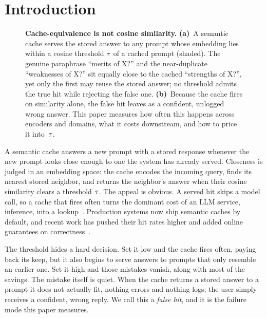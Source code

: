 \section{Introduction}
\label{sec:intro}

\begin{figure}[t]
  \centering
  
  \caption{\textbf{Cache-equivalence is not cosine similarity.} \textbf{(a)}~A semantic cache
    serves the stored answer to any prompt whose embedding lies within a cosine threshold
    $\tau$ of a cached prompt (shaded). The genuine paraphrase ``merits of X?'' and the
    near-duplicate ``weaknesses of X?'' sit equally close to the cached ``strengths of X?'',
    yet only the first may reuse the stored answer; no threshold admits the true hit while
    rejecting the false one. \textbf{(b)}~Because the cache fires on similarity alone, the
    false hit leaves as a confident, unlogged wrong answer. This paper measures how often this
    happens across encoders and domains, what it costs downstream, and how to price it
    into~$\tau$.}
  \label{fig:teaser}
\end{figure}

A semantic cache answers a new prompt with a stored response whenever the new prompt
looks close enough to one the system has already served. Closeness is judged in an
embedding space: the cache encodes the incoming query, finds its nearest stored
neighbor, and returns the neighbor's answer when their cosine similarity clears a
threshold $\tau$. The appeal is obvious. A served hit skips a model call, so a cache
that fires often turns the dominant cost of an \mbox{LLM} service, inference, into a
lookup~\cite{bang2023gptcache,gill2024meancache}. Production systems now ship semantic
caches by default, and recent work has pushed their hit rates higher and added online
guarantees on correctness~\cite{schroeder2025vcache,wang2025categoryaware}.

The threshold hides a hard decision. Set it low and the cache fires often, paying back
its keep, but it also begins to serve answers to prompts that only resemble an earlier
one. Set it high and those mistakes vanish, along with most of the savings. The mistake
itself is quiet. When the cache returns a stored answer to a prompt it does not actually
fit, nothing errors and nothing logs; the user simply receives a confident, wrong
reply. We call this a \emph{false hit}, and it is the failure mode this paper measures.

